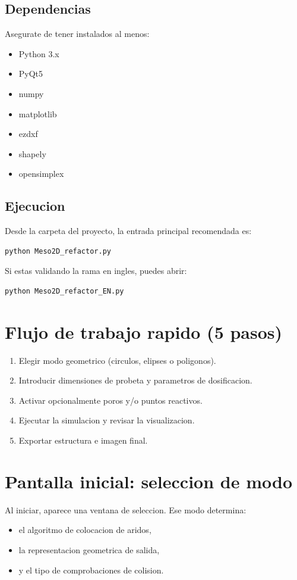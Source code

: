 \documentclass[11pt,a4paper]{article}
\begin{document}
\subsection{Dependencias}
Asegurate de tener instalados al menos:
\begin{itemize}[leftmargin=1.5em]
  \item Python 3.x
  \item PyQt5
  \item numpy
  \item matplotlib
  \item ezdxf
  \item shapely
  \item opensimplex
\end{itemize}

\subsection{Ejecucion}
Desde la carpeta del proyecto, la entrada principal recomendada es:
\begin{lstlisting}[style=cmd]
python Meso2D_refactor.py
\end{lstlisting}

Si estas validando la rama en ingles, puedes abrir:
\begin{lstlisting}[style=cmd]
python Meso2D_refactor_EN.py
\end{lstlisting}

\section{Flujo de trabajo rapido (5 pasos)}
\begin{enumerate}[leftmargin=1.7em]
  \item Elegir modo geometrico (circulos, elipses o poligonos).
  \item Introducir dimensiones de probeta y parametros de dosificacion.
  \item Activar opcionalmente poros y/o puntos reactivos.
  \item Ejecutar la simulacion y revisar la visualizacion.
  \item Exportar estructura e imagen final.
\end{enumerate}

\section{Pantalla inicial: seleccion de modo}
Al iniciar, aparece una ventana de seleccion. Ese modo determina:
\begin{itemize}[leftmargin=1.5em]
  \item el algoritmo de colocacion de aridos,
  \item la representacion geometrica de salida,
  \item y el tipo de comprobaciones de colision.
\end{itemize}
\end{document}

